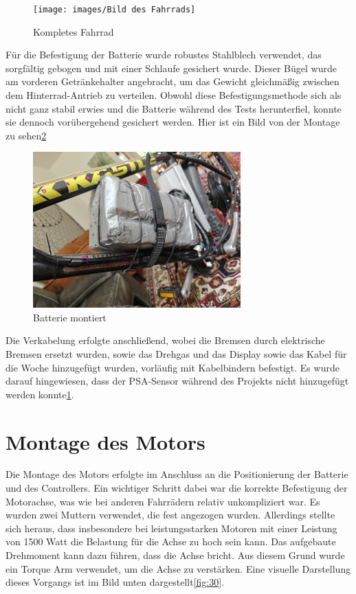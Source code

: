 \begin{figure}[h!]
    \centering
    \texttt{[image: images/Bild des Fahrrads]}
    \caption{Kompletes Fahrrad\cite{lorenz_scherrer_selbst_2023}}
    \label{fig:28}
\end{figure}


Für die Befestigung der Batterie wurde robustes Stahlblech verwendet, das sorgfältig gebogen und mit einer Schlaufe gesichert wurde.
Dieser Bügel wurde am vorderen Getränkehalter angebracht, um das Gewicht gleichmäßig zwischen dem Hinterrad-Antrieb zu verteilen.
Obwohl diese Befestigungsmethode sich als nicht ganz stabil erwies und die Batterie während des Tests herunterfiel, konnte sie dennoch vorübergehend gesichert werden.
Hier ist ein Bild von der Montage zu sehen\ref{fig:29}
\begin{figure}[h!]
    \centering
    \includegraphics[width=8cm]{images/Bild der Batterie am Fahrrad}
    \caption{Batterie montiert\cite{lorenz_scherrer_selbst_2023}}
    \label{fig:29}
\end{figure}


Die Verkabelung erfolgte anschließend, wobei die Bremsen durch elektrische Bremsen ersetzt wurden, sowie das Drehgas und das Display sowie das Kabel für die Woche hinzugefügt wurden, vorläufig mit Kabelbindern befestigt. 
Es wurde darauf hingewiesen, dass der PSA-Sensor während des Projekts nicht hinzugefügt werden konnte\ref{fig:28}.






\section{Montage des Motors}


Die Montage des Motors erfolgte im Anschluss an die Positionierung der Batterie und des Controllers. 
Ein wichtiger Schritt dabei war die korrekte Befestigung der Motorachse, was wie bei anderen Fahrrädern relativ unkompliziert war. 
Es wurden zwei Muttern verwendet, die fest angezogen wurden. 
Allerdings stellte sich heraus, dass insbesondere bei leistungsstarken Motoren mit einer Leistung von 1500 Watt die Belastung für die Achse zu hoch sein kann. 
Das aufgebaute Drehmoment kann dazu führen, dass die Achse bricht. 
Aus diesem Grund wurde ein Torque Arm verwendet, um die Achse zu verstärken. 
Eine visuelle Darstellung dieses Vorgangs ist im Bild unten dargestellt\ref{fig:30}.

